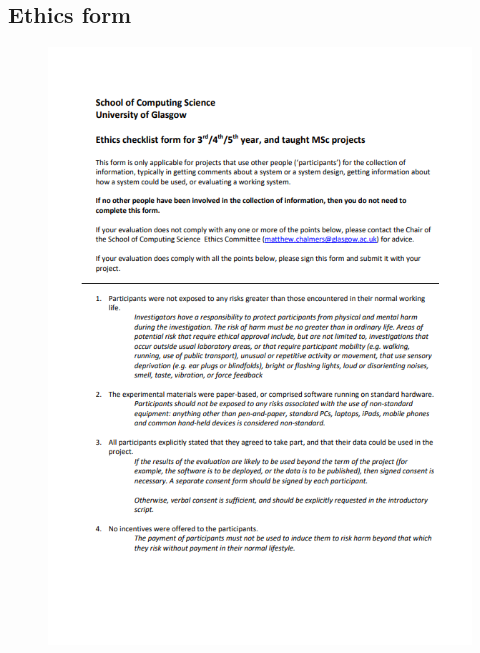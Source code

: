\documentclass{l4proj}
\begin{document}
\begin{appendices}
\subsection{Ethics form}
\begin{figure}
    \centering
    \includegraphics[width=1\linewidth]{images//Ethics form/p1.png}
\end{figure}
\clearpage


\end{appendices}
\end{document}
